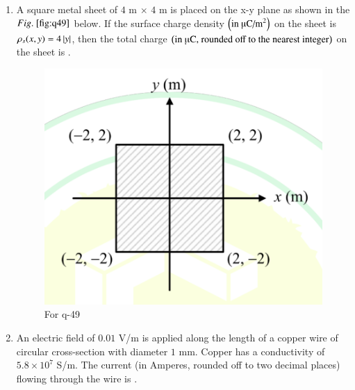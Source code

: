 \documentclass[journal,12pt,onecolumn]{IEEEtran}
\theoremstyle{remark}
\begin{document}
\begin{enumerate}
\hfill{}

\begin{enumerate}
\end{enumerate}

\item A square metal sheet of $4$ m $\times$ $4$ m is placed on the x-y plane as shown in the $\figref{fig:q49}$ below. If the surface charge density $\brak{\text{in \textmu C/m}^2}$ on the sheet is $\rho_s(x, y) = 4\left\vert y\right\vert$, then the total charge $\brak{\text{in \textmu C, rounded off to the nearest integer}}$ on the sheet is \underline{\hspace{2cm}}.
\begin{figure}[H]
\centering
\includegraphics[width=0.4\columnwidth]{q49}
\caption{For q-49}
\label{fig:q49}
\end{figure}

\hfill{}

\begin{enumerate}
\end{enumerate}

\item An electric field of $0.01$ V/m is applied along the length of a copper wire of circular cross-section with diameter $1$ mm. Copper has a conductivity of $5.8 \times 10^7$ S/m. The current (in Amperes, rounded off to two decimal places) flowing through the wire is \underline{\hspace{2cm}}.


\end{enumerate}
\end{document}
